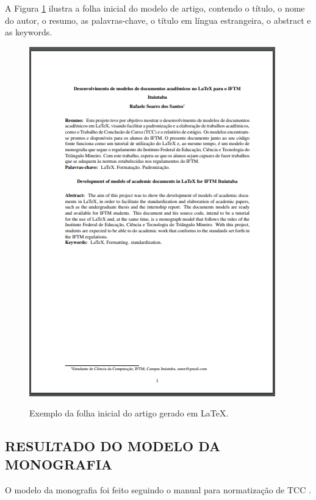A Figura \ref{iniart} ilustra a folha inicial do modelo de artigo, contendo o título, o nome do autor, o resumo, as palavras-chave, o título em língua estrangeira, o abstract e as keywords.\\
\begin{figure}[h]
	\centering
	\includegraphics{imagens/artigo/folhaInicial.png}\\
	\caption{Exemplo da folha inicial do artigo gerado em LaTeX.}
	\label{iniart}
\end{figure}

\newpage
\subsection{RESULTADO DO MODELO DA MONOGRAFIA}
O modelo da monografia foi feito seguindo o manual para normatização de TCC \cite{manualTCC}.\\


